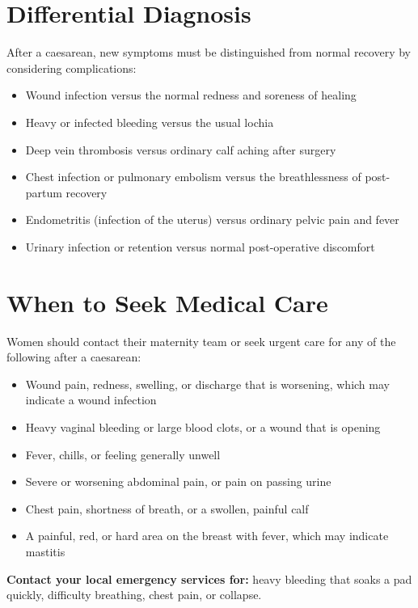 \section*{Differential Diagnosis}
After a caesarean, new symptoms must be distinguished from normal recovery by considering complications:
\begin{itemize}
    \item Wound infection versus the normal redness and soreness of healing
    \item Heavy or infected bleeding versus the usual lochia
    \item Deep vein thrombosis versus ordinary calf aching after surgery
    \item Chest infection or pulmonary embolism versus the breathlessness of post-partum recovery
    \item Endometritis (infection of the uterus) versus ordinary pelvic pain and fever
    \item Urinary infection or retention versus normal post-operative discomfort
\end{itemize}

\section*{When to Seek Medical Care}
Women should contact their maternity team or seek urgent care for any of the following after a caesarean:
\begin{itemize}
    \item Wound pain, redness, swelling, or discharge that is worsening, which may indicate a wound infection
    \item Heavy vaginal bleeding or large blood clots, or a wound that is opening
    \item Fever, chills, or feeling generally unwell
    \item Severe or worsening abdominal pain, or pain on passing urine
    \item Chest pain, shortness of breath, or a swollen, painful calf
    \item A painful, red, or hard area on the breast with fever, which may indicate mastitis
\end{itemize}

\textbf{Contact your local emergency services for:} heavy bleeding that soaks a pad quickly, difficulty breathing, chest pain, or collapse.

